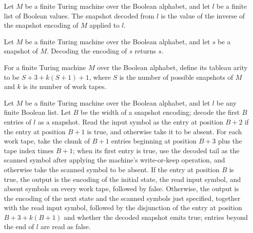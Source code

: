\begin{definition}
\label{Complexity.snapDecode}
\leanok
{}
Let $M$ be a finite Turing machine over the Boolean alphabet, and let $l$ be a finite
list of Boolean values. The snapshot decoded from $l$ is the value of the inverse of the
snapshot encoding of $M$ applied to $l$.
\end{definition}

\begin{theorem}
\label{Complexity.snapDecode_snapEncode}
\leanok
{}
Let $M$ be a finite Turing machine over the Boolean alphabet, and let $s$ be a snapshot
of $M$. Decoding the encoding of $s$ returns $s$.
\end{theorem}

\begin{definition}
\label{Complexity.tableauArity}
\leanok
{}
For a finite Turing machine $M$ over the Boolean alphabet, define its tableau arity to
be $S+3+k(S+1)+1$, where $S$ is the number of possible snapshots of $M$ and $k$ is its
number of work tapes.
\end{definition}

\begin{definition}
\label{Complexity.tableauStep}
\leanok
{}
Let $M$ be a finite Turing machine over the Boolean alphabet, and let $l$ be any finite
Boolean list. Let $B$ be the width of a snapshot encoding; decode the first $B$ entries
of $l$ as a snapshot. Read the input symbol as the entry at position $B+2$ if the entry
at position $B+1$ is true, and otherwise take it to be absent. For each work tape, take
the chunk of $B+1$ entries beginning at position $B+3$ plus the tape index times $B+1$;
when its first entry is true, use the decoded tail as the scanned symbol after applying
the machine's write-or-keep operation, and otherwise take the scanned symbol to be
absent. If the entry at position $B$ is true, the output is the encoding of the initial
state, the read input symbol, and absent symbols on every work tape, followed by false.
Otherwise, the output is the encoding of the next state and the scanned symbols just
specified, together with the read input symbol, followed by the disjunction of the entry
at position $B+3+k(B+1)$ and whether the decoded snapshot emits true; entries beyond the
end of $l$ are read as false.
\end{definition}

